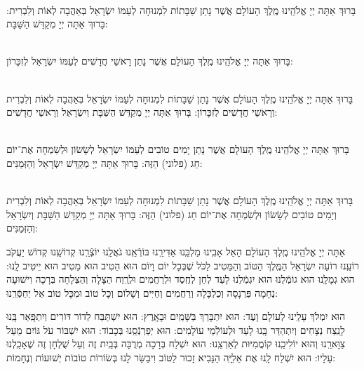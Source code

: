 \documentclass[twoside, openany, parskip=half, 11pt]{book}
\begin{document}
\begin{sometimes}

\\
בָּרוּךְ אַתָּה יְיָ אֱלֹהֵֽינוּ מֶֽלֶךְ הָעוֹלָם אֲשֶׁר נָתַן שַׁבָּתוֹת לִמְנוּחָה לְעַמּוֹ יִשְׂרָאֵל בְּאַהֲבָה 
לְאוֹת וְלִבְרִית: בָּרוּךְ אַתָּה יְיָ מְקַדֵּשׁ הַשַּׁבָּת:


\\
בָּרוּךְ אַתָּה יְיָ אֱלֹהֵֽינוּ מֶֽלֶךְ הָעוֹלָם 
אֲשֶׁר נָתַן רָאשֵׁי חֳדָשִׁים לְעַמּוֹ יִשְׂרָאֵל לְזִכָּרוֹן:


\\
בָּרוּךְ אַתָּה יְיָ אֱלֹהֵֽינוּ מֶֽלֶךְ הָעוֹלָם 
אֲשֶׁר נָתַן שַׁבָּתוֹת לִמְנוּחָה לְעַמּוֹ יִשְׂרָאֵל בְּאַהֲבָה לְאוֹת וְלִבְרִית וְרָאשֵׁי חֳדָשִׁים לְזִכָּרוֹן: 
בָּרוּךְ אַתָּה יְיָ מְקַדֵּשׁ הַשַּׁבָּת וְיִשְׂרָאֵל וְרָאשֵׁי חֳדָשִׁים:

\\
בָּרוּךְ אַתָּה יְיָ אֱלֹהֵֽינוּ מֶֽלֶךְ הָעוֹלָם 
אֲשֶׁר נָתַן יָמִים טוֹבִים לְעַמּוֹ יִשְׂרָאֵל 
לְשָׂשׂוֹן וּלְשִׂמְחָה אֶת־יוֹם חַג (פלוני) הַזֶּה: 
בָּרוּךְ אַתָּה יְיָ מְקַדֵּשׁ יִשְׂרָאֵל וְהַזְּמַנִּים:

\\
בָּרוּךְ אַתָּה יְיָ אֱלֹהֵֽינוּ מֶֽלֶךְ הָעוֹלָם אֲשֶׁר נָתַן שַׁבָּתוֹת לִמְנוּחָה לְעַמּוֹ יִשְׂרָאֵל בְּאַהֲבָה לְאוֹת וְלִבְרִית 
וְיָמִים טוֹבִים לְשָׂשׂוֹן וּלְשִׂמְחָה אֶת־יוֹם חַג (פלוני) הַזֶּה: 
בָּרוּךְ אַתָּה יְיָ מְקַדֵּשׁ הַשַּׁבָּת וְיִשְׂרָאֵל וְהַזְּמַנִּים:

\end{sometimes}


 אַתָּה יְיָ אֱלֹהֵֽינוּ מֶֽלֶךְ הָעוֹלָם הָאֵל אָבִֽינוּ מַלְכֵּֽנוּ אַדִּירֵֽנוּ בּוֹרְֿאֵֽנוּ גֹאֲלֵֽנוּ יוֹצְֿרֵֽנוּ קְדוֹשֵֽׁנוּ קְדוֹשׁ יַעֲקֹב רוֹעֵֽנוּ רוֹעֵה יִשְׂרָאֵל הַמֶּֽלֶךְ הַטּוֹב וְהַמֵּטִיב לַכֹּל שֶׁבְּכָל יוֹם וָיוֹם הוּא הֵטִיב הוּא מֵטִיב הוּא יֵיטִיב לָֽנוּ: הוּא גְמָלָֽנוּ הוּא גוֹמְֿלֵנוּ הוּא יִגְמְֿלֵנוּ לָעַד לְחֵן לְחֶֽסֶד וּלְרַחֲמִים וּלְרֶֽוַח הַצָּלָה וְהַצְלָחָה בְּרָכָה וִישׁוּעָה נֶחָמָה פַּרְנָסָה וְכַלְכָּלָה וְרַחֲמִים וְחַיִּים וְשָׁלוֹם וְכָל טוֹב וּמִכָּל טוֹב אַל יְחַסְּֿרֵֽנוּ: 




 הוּא יִמְלֹךְ עָלֵֽינוּ לְעוֹלָם וָעֶד: 
	 הוּא יִתְבָּרַךְ בַּשָּׁמַֽיִם וּבָאָֽרֶץ: 
	 הוּא יִשְׁתַּבַּח לְדוֹר דּוֹרִים וְיִתְפָּֽאַר בָּֽנוּ לָנֵֽצַח נְצָחִים 
		 וְיִתְהַדַּר בָּֽנוּ לָעַד וּלְעוֹלְֿמֵי עוֹלָמִים: 
	 הוּא יְפַרְנְֿסֵֽנוּ בְּכָבוֹד: 
	 הוּא יִשְׁבּוֹר עֹל גּוֹיִם מֵעַל צַוָּארֵֽנוּ וְהוּא יוֹלִיכֵֽנוּ קוֹמֲמִיּוּת לְאַרְצֵֽנוּ: 
	 הוּא יִשְׁלַח בְּרָכָה מְרֻבָּה בְּבַֽיִת זֶה וְעַל שֻׁלְחָן זֶה שֶׁאָכַֽלְנוּ עָלָיו: 
 הוּא יִשְׁלַח לָֽנוּ אֶת אֵלִיָּֽה הַנָּבִיא זָכוּר לַטּוֹב וִיבַשֵּׂר לָנוּ בְּשׂוֹרוֹת טוֹבוֹת יְשׁוּעוֹת וְנֶחָמוֹת:
\end{document}
